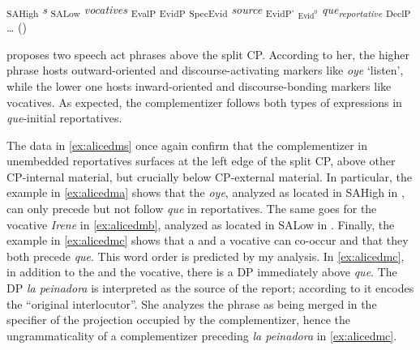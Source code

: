 \ea \label{struc:alicerep} {\ob}\textsubscript{SAHigh} \emph{s} {\ob}\textsubscript{SALow} \emph{vocatives} {\ob}\textsubscript{EvalP} {\ob}\textsubscript{EvidP} {\ob}\textsubscript{SpecEvid} \emph{source} {\cb} {\ob}\textsubscript{EvidP'} {\ob}$_{\text{Evid}^0}$ \emph{que\textsubscript{reportative}}{\cb}{\cb} {\ob}\textsubscript{DeclP} \dots {\cb}{\cb}{\cb}{\cb}{\cb} (\citealt{Corr2016})
\z 

\citet{Corr2016} proposes two speech act phrases above the split CP. According to her, the higher phrase hosts outward-oriented  and discourse-activating markers like \emph{oye} `listen', while the lower one  hosts inward-oriented and discourse-bonding markers like vocatives.  As expected, the complementizer follows both types of expressions in  \emph{que}-initial reportatives.

The data in \eqref{ex:alicedms} once again confirm that the complementizer in unembedded reportatives surfaces at the left edge of the split CP, above 
other CP-internal material, but crucially below CP-external material.
In particular, the example in \eqref{ex:alicedma} shows that the  \emph{oye}, analyzed as located in SAHigh in \citet{Corr2016}, can only precede but not follow \emph{que} in reportatives. The same goes for the vocative \emph{Irene} in \eqref{ex:alicedmb}, analyzed as located in SALow in \citet{Corr2016}. Finally, the example in  \eqref{ex:alicedmc} shows that a  and a vocative can co-occur and that they  both precede \emph{que}. This word order is predicted by my analysis.
In \eqref{ex:alicedmc}, in addition to the  and the vocative, there is  a DP immediately above \emph{que}. The DP  \emph{la peinadora} is interpreted as the source of the report; according to \citet[152]{Corr2016} it  encodes the {``original
	interlocutor''}. She analyzes the phrase as being merged in the specifier of the projection occupied by the complementizer, hence the ungrammaticality of a complementizer preceding \emph{la peinadora} in \eqref{ex:alicedmc}.  

